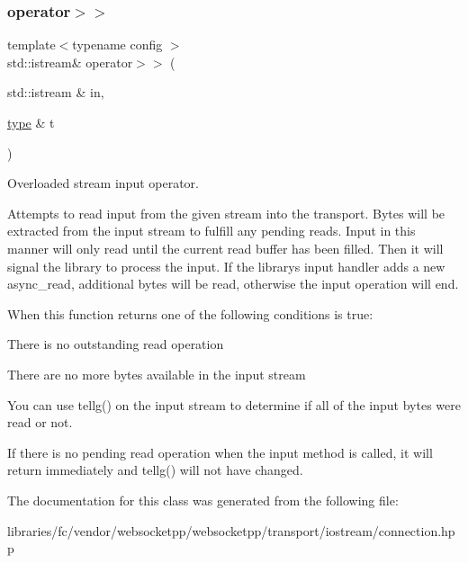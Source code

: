 \subsubsection{\texorpdfstring{operator$>$$>$}{operator>>}}
{\footnotesize\ttfamily template$<$typename config $>$ \\
std\+::istream\& operator$>$$>$ (\begin{DoxyParamCaption}\item[{std\+::istream \&}]{in,  }\item[{\mbox{\hyperlink{classwebsocketpp_1_1transport_1_1iostream_1_1connection_a39c8ef910236a223be66a8338962cb99}{type}} \&}]{t }\end{DoxyParamCaption})\hspace{0.3cm}{\ttfamily [friend]}}



Overloaded stream input operator. 

Attempts to read input from the given stream into the transport. Bytes will be extracted from the input stream to fulfill any pending reads. Input in this manner will only read until the current read buffer has been filled. Then it will signal the library to process the input. If the library\textquotesingle{}s input handler adds a new async\+\_\+read, additional bytes will be read, otherwise the input operation will end.

When this function returns one of the following conditions is true\+:
\begin{DoxyItemize}
\item There is no outstanding read operation
\item There are no more bytes available in the input stream
\end{DoxyItemize}

You can use tellg() on the input stream to determine if all of the input bytes were read or not.

If there is no pending read operation when the input method is called, it will return immediately and tellg() will not have changed. 

The documentation for this class was generated from the following file\+:\begin{DoxyCompactItemize}
\item 
libraries/fc/vendor/websocketpp/websocketpp/transport/iostream/connection.\+hpp\end{DoxyCompactItemize}
